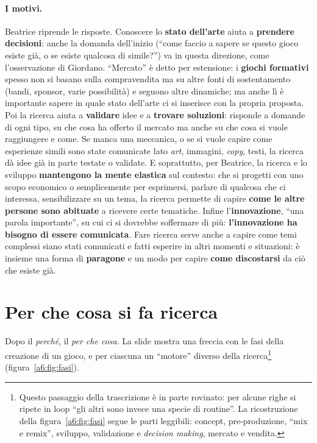 \paragraph{I motivi.} Beatrice riprende le risposte. Conoscere lo \textbf{stato
dell'arte} aiuta a \textbf{prendere decisioni}: anche la domanda dell'inizio (``come
faccio a sapere se questo gioco esiste già, o se esiste qualcosa di simile?'') va in
questa direzione, come l'osservazione di Giordano. ``Mercato'' è detto per estensione:
i \textbf{giochi formativi} spesso non si basano sulla compravendita ma su altre fonti
di sostentamento (bandi, sponsor, varie possibilità) e seguono altre dinamiche; ma
anche lì è importante sapere in quale stato dell'arte ci si inserisce con la propria
proposta. Poi la ricerca aiuta a \textbf{validare} idee e a \textbf{trovare
soluzioni}: risponde a domande di ogni tipo, su che cosa ha offerto il mercato ma
anche su che cosa si vuole raggiungere e come. Se manca una meccanica, o se si vuole
capire come esperienze simili sono state comunicate lato \emph{art}, immagini,
\emph{copy}, testi, la ricerca dà idee già in parte testate o validate. E soprattutto,
per Beatrice, la ricerca e lo sviluppo \textbf{mantengono la mente elastica} sul
contesto: che si progetti con uno scopo economico o semplicemente per esprimersi,
parlare di qualcosa che ci interessa, sensibilizzare su un tema, la ricerca permette
di capire \textbf{come le altre persone sono abituate} a ricevere certe tematiche.
Infine l'\textbf{innovazione}, ``una parola importante'', su cui ci si dovrebbe
soffermare di più: \textbf{l'innovazione ha bisogno di essere comunicata}. Fare
ricerca serve anche a capire come temi complessi siano stati comunicati e fatti
esperire in altri momenti e situazioni: è insieme una forma di \textbf{paragone} e un
modo per capire \textbf{come discostarsi} da ciò che esiste già.

\section{Per che cosa si fa ricerca}
\label{a6:sec:percosa}



Dopo il \emph{perché}, il \emph{per che cosa}. La slide mostra una freccia con le
fasi della creazione di un gioco, e per ciascuna un ``motore'' diverso della
ricerca\footnote{Questo passaggio della trascrizione è in parte rovinato: per alcune
righe si ripete in loop ``gli altri sono invece una specie di routine''. La
ricostruzione della figura~\ref{a6:fig:fasi} segue le parti leggibili: concept,
pre-produzione, ``mix e remix'', sviluppo, validazione e \emph{decision making},
mercato e vendita.} (figura~\ref{a6:fig:fasi}).


